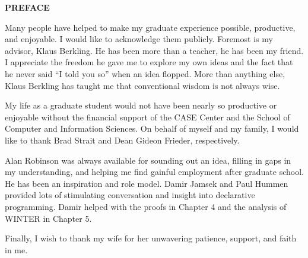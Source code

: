 \clearpage
\thispagestyle{plain}
\begin{center}
\textbf{PREFACE}
\end{center}

\vspace{0.8in}

Many people have helped to make my graduate experience possible, productive,
and enjoyable. I would like to acknowledge them publicly. Foremost is my
advisor, Klaus Berkling. He has been more than a teacher, he has been my
friend. I appreciate the freedom he gave me to explore my own ideas and the
fact that he never said ``I told you so'' when an idea flopped. More than
anything else, Klaus Berkling has taught me that conventional wisdom is not
always wise.

My life as a graduate student would not have been nearly so productive or
enjoyable without the financial support of the CASE Center and the School of
Computer and Information Sciences. On behalf of myself and my family, I would
like to thank Brad Strait and Dean Gideon Frieder, respectively.

Alan Robinson was always available for sounding out an idea, filling in gaps
in my understanding, and helping me find gainful employment after graduate
school. He has been an inspiration and role model. Damir Jamsek and Paul
Hummen provided lots of stimulating conversation and insight into declarative
programming. Damir helped with the proofs in Chapter 4 and the analysis of
WINTER in Chapter 5.

Finally, I wish to thank my wife for her unwavering patience, support, and
faith in me.
